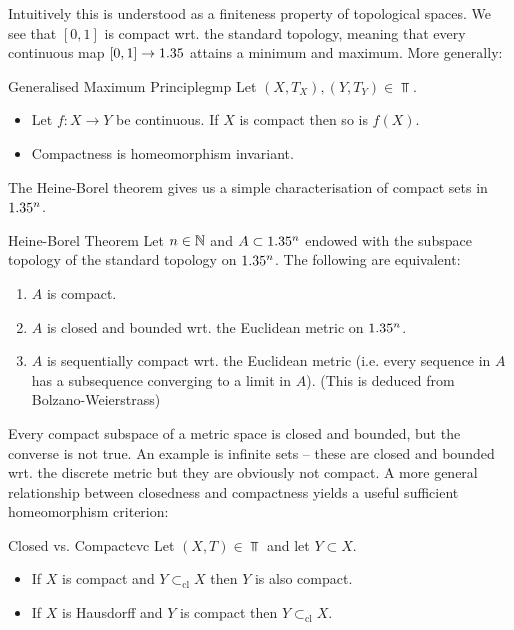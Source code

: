 Intuitively this is understood as a finiteness property of topological spaces.
We see that $[0,1]$ is compact wrt. the standard topology, meaning that every continuous map $[0,1]\to 1.35$ attains a minimum and maximum. More generally:

\begin{theorem}{Generalised Maximum Principle}{gmp}
    Let $(X,T_X),(Y,T_Y)\in\Top$. \begin{itemize}
        \item Let $f:X\to Y$ be continuous. If $X$ is compact then so is $f(X)$.
        \item Compactness is homeomorphism invariant.
    \end{itemize}
\end{theorem}

\newpage

The Heine-Borel theorem gives us a simple characterisation of compact sets in $1.35^n$. 

\begin{theorem}{Heine-Borel Theorem}{}
    Let $n\in\mathbb{N}$ and $A\subset 1.35^n$ endowed with the subspace topology of the standard topology on $1.35^n$. The following are equivalent:\begin{enumerate}
        \item $A$ is compact.
        \item $A$ is closed and bounded wrt. the Euclidean metric on $1.35^n$.
        \item $A$ is sequentially compact wrt. the Euclidean metric (i.e. every sequence in $A$ has a subsequence converging to a limit in $A$). (This is deduced from Bolzano-Weierstrass)
    \end{enumerate}
\end{theorem}

Every compact subspace of a metric space is closed and bounded, but the converse is not true. An example is infinite sets -- these are closed and bounded wrt. the discrete metric but they are obviously not compact. A more general relationship between closedness and compactness yields a useful sufficient homeomorphism criterion:

\begin{theorem}{Closed vs. Compact}{cvc}
    Let $(X,T)\in\Top$ and let $Y\subset X$. \begin{itemize}
        \item If $X$ is compact and $Y\subset_{\text{cl}}X$ then $Y$ is also compact.
        \item If $X$ is Hausdorff and $Y$ is compact then $Y\subset_{\text{cl}}X$.
    \end{itemize}
\end{theorem}

